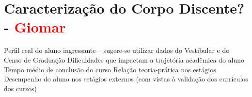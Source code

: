 \chapter{Caracterização do Corpo Discente? - \textcolor{red}{Giomar}}

Perfil real do aluno ingressante – sugere-se utilizar dados do Vestibular e do Censo de Graduação
Dificuldades que impactam a trajetória acadêmica do aluno
Tempo médio de conclusão do curso
Relação teoria-prática nos estágios
Desempenho do aluno nos estágios externos (com vistas à validação dos currículos dos cursos) 

